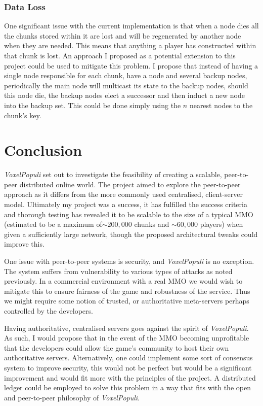 \documentclass[12pt,notitlepage,a4paper]{report}
\newcommand{\voxpop}{\emph{VoxelPopuli}}
\begin{document}
	\subsection{Data Loss}
	One significant issue with the current implementation is that when a node dies all the chunks stored within it are lost and will be regenerated by another node when they are needed. This means that anything a player has constructed within that chunk is lost. An approach I proposed as a potential extension to this project could be used to mitigate this problem. I propose that instead of having a single node responsible for each chunk, have a node and several backup nodes, periodically the main node will multicast its state to the backup nodes, should this node die, the backup nodes elect a successor and then induct a new node into the backup set. This could be done simply using the $n$ nearest nodes to the chunk's key.
	
	\clearpage
	\chapter{Conclusion}
	\voxpop{} set out to investigate the feasibility of creating a scalable, peer-to-peer distributed online world. The project aimed to explore the peer-to-peer approach as it differs from the more commonly used centralised, client-server model. Ultimately my project was a success, it has fulfilled the success criteria and thorough testing has revealed it to be scalable to the size of a typical MMO (estimated to be a maximum of$\sim200,000$ chunks and $\sim60,000$ players) when given a sufficiently large network, though the proposed architectural tweaks could improve this.
	
	One issue with peer-to-peer systems is security, and \voxpop{} is no exception. The system suffers from vulnerability to various types of attacks as noted previously. In a commercial environment with a real MMO we would wish to mitigate this to ensure fairness of the game and robustness of the service. Thus we might require some notion of trusted, or authoritative meta-servers perhaps controlled by the developers.
	
	Having authoritative, centralised servers goes against the spirit of \voxpop{}. As such, I would propose that in the event of the MMO becoming unprofitable that the developers could allow the game's community to host their own authoritative servers. Alternatively, one could implement some sort of consensus system to improve security, this would not be perfect but would be a significant improvement and would fit more with the principles of the project. A distributed ledger could be employed to solve this problem in a way that fits with the open and peer-to-peer philosophy of \voxpop{}.
	
\end{document}
